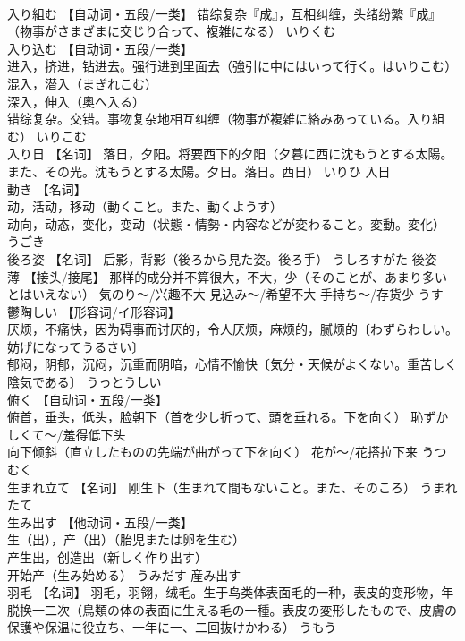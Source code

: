 \documentclass[8pt]{extreport}
\begin{document}
\begin{CJK}{UTF8}{min}
\\	入り組む	【自动词・五段/一类】 错综复杂『成』，互相纠缠，头绪纷繁『成』（物事がさまざまに交じり合って、複雑になる）	いりくむ	
\\	入り込む	【自动词・五段/一类】 
\\	进入，挤进，钻进去。强行进到里面去（強引に中にはいって行く。はいりこむ） 
\\	混入，潜入（まぎれこむ） 
\\	深入，伸入（奥へ入る） 
\\	错综复杂。交错。事物复杂地相互纠缠（物事が複雑に絡みあっている。入り組む）	いりこむ	
\\	入り日	【名词】 落日，夕阳。将要西下的夕阳（夕暮に西に沈もうとする太陽。また、その光。沈もうとする太陽。夕日。落日。西日）	いりひ	入日
\\	動き	【名词】 
\\	动，活动，移动（動くこと。また、動くようす） 
\\	动向，动态，变化，变动（状態・情勢・内容などが変わること。変動。変化）	うごき	
\\	後ろ姿	【名词】 后影，背影（後ろから見た姿。後ろ手）	うしろすがた	後姿
\\	薄	【接头/接尾】 那样的成分并不算很大，不大，少（そのことが、あまり多いとはいえない） 気のり～/兴趣不大 見込み～/希望不大 手持ち～/存货少	うす	
\\	鬱陶しい	【形容词/イ形容词】 
\\	厌烦，不痛快，因为碍事而讨厌的，令人厌烦，麻烦的，腻烦的〔わずらわしい。妨げになってうるさい〕 
\\	郁闷，阴郁，沉闷，沉重而阴暗，心情不愉快〔気分・天候がよくない。重苦しく陰気である〕	うっとうしい	
\\	俯く	【自动词・五段/一类】 
\\	俯首，垂头，低头，脸朝下（首を少し折って、頭を垂れる。下を向く） 恥ずかしくて～/羞得低下头 
\\	向下倾斜（直立したものの先端が曲がって下を向く） 花が～/花搭拉下来	うつむく	
\\	生まれ立て	【名词】 刚生下（生まれて間もないこと。また、そのころ）	うまれたて	
\\	生み出す	【他动词・五段/一类】 
\\	生（出），产（出）（胎児または卵を生む） 
\\	产生出，创造出（新しく作り出す） 
\\	开始产（生み始める）	うみだす	産み出す
\\	羽毛	【名词】 羽毛，羽翎，绒毛。生于鸟类体表面毛的一种，表皮的变形物，年脱换一二次（鳥類の体の表面に生える毛の一種。表皮の変形したもので、皮膚の保護や保温に役立ち、一年に一、二回抜けかわる）	うもう	

\end{CJK}
\end{document}
